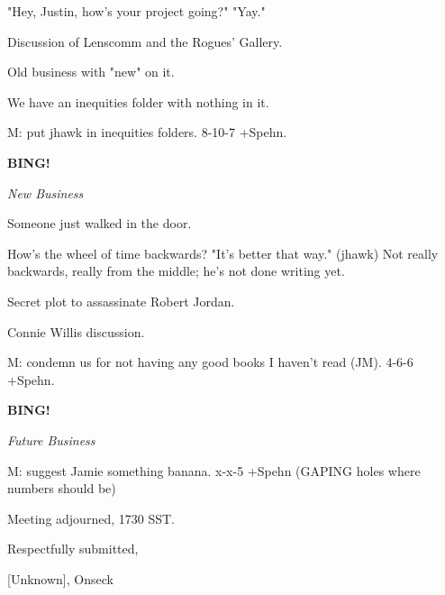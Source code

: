 \documentclass[12pt]{article}
\newcommand{\bing}{{\bf BING!} }
\newcommand{\goto}[1]{\bing \vskip 12pt \centerline{{\em{#1}}}}
\begin{document}
"Hey, Justin, how's your project going?" "Yay."

Discussion of Lenscomm and the Rogues' Gallery.

Old business with "new" on it.

We have an inequities folder with nothing in it.

M: put jhawk in inequities folders. 8-10-7 +Spehn.

\goto{New Business}

Someone just walked in the door.

How's the wheel of time backwards? "It's better that way." (jhawk) Not really backwards, really from the middle; he's not done writing yet.

Secret plot to assassinate Robert Jordan.

Connie Willis discussion.

M: condemn us for not having any good books I haven't read (JM). 4-6-6 +Spehn.

\goto{Future Business}

M: suggest Jamie something banana. x-x-5 +Spehn (GAPING holes where numbers should be)

\vspace{12pt}

\noindent
Meeting adjourned, 1730 SST.

\vspace{18pt}

\centerline{Respectfully submitted,}
\centerline{[Unknown], Onseck}
\end{document}

